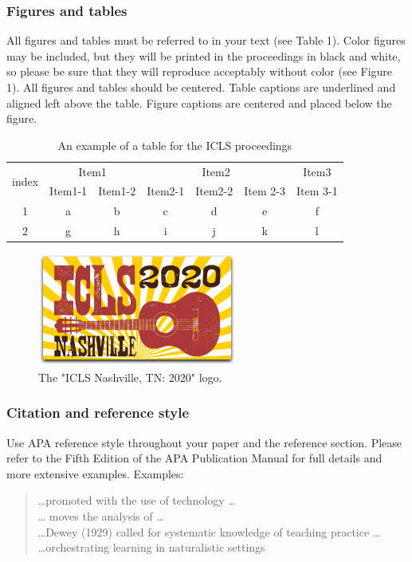 \documentclass{article}
\begin{document}
\subsubsection{Figures and tables}
All figures and tables must be referred to in your text (see Table 1). Color figures may be included, but they will be printed in the proceedings in black and white, so please be sure that they will reproduce acceptably without color (see Figure 1). All figures and tables should be centered. Table captions are underlined and aligned left
above the table. Figure captions are centered and placed below the figure.

\begin{table}[H]
\caption{An example of a table for the ICLS proceedings}

\centering
\begin{tabular}{c || c | c | c | c | c | c}
\hline
\multirow{2}{*}{index} & \multicolumn{2}{c|}{Item1}&\multicolumn{3}{c|}{Item2} & Item3 \\ \cline{2-7}
& Item1-1 & Item1-2 & Item2-1 & Item2-2 & Item 2-3 & Item 3-1 \\ \hline \hline 
1 & a & b & c & d & e & f \\ \hline
2 & g & h & i & j & k & l \\ \hline
\end{tabular}
\end{table}

\begin{figure}[H]
\begin{center}
\includegraphics[width=.25\textwidth]{logo}
\end{center}
\caption{The "ICLS Nashville, TN: 2020" logo.}
\end{figure}

\subsubsection{Citation and reference style}
Use APA reference style throughout your paper and the reference section. Please refer to the Fifth Edition of the APA Publication Manual for full details and more extensive examples. Examples:

\begin{quotation}
\dots promoted with the use of technology \parencite[e.g.,][]{hawkins_tools_1987} \dots \\
\dots \textcite{lave_cognition_1988} moves the analysis of \dots \\
\dots Dewey (1929) called for systematic knowledge of teaching practice \dots \\
\dots orchestrating learning in naturalistic settings \parencite{brown_design_1992, bruner_postscript_1999}
\end{quotation}

\renewcommand{\notesname}{Endnotes (use Heading 1)} %
\theendnotes
\end{document}
